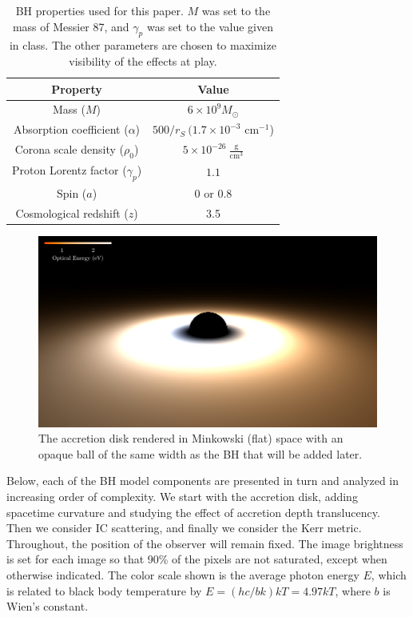 \documentclass[twocolumn,twocolappendix]{aastex631}
\begin{document}
\begin{table}[htbp!]
  \centering
  \begin{tabular}{cc}
    \hline \hline 
    Property  & Value \\ \hline
    Mass ($M$) & $6 \times 10^{9} M_\odot$ \\ 
    Absorption coefficient ($\alpha$) & $500/r_S\ (1.7\times 10^{-3}$ cm$^{-1}$) \\ 
    Corona scale density ($\rho_0$) & $5 \times 10^{-26}\ \frac{\text{g}}{\text{cm}^3}$ \\ 
    Proton Lorentz factor ($\gamma_p$) & $1.1$ \\ 
    Spin ($a$) & 0 or 0.8 \\ 
    Cosmological redshift ($z$) & 3.5 \\ 
    \hline \hline
  \end{tabular}
  \caption{BH properties used for this paper. $M$ was set to the mass of Messier 87, and $\gamma_p$ was set to the value given in class. The other parameters are chosen to maximize visibility of the effects at play.}
  \label{tab:props}
\end{table}

\begin{figure}[htbp!]
  \centering
  \includegraphics[width=\linewidth]{../imager/small/minkowski-optical.pdf}
  \caption{The accretion disk rendered in Minkowski (flat) space with an opaque ball of the same width as the BH that will be added later.}
  \label{fig:mink}
\end{figure}

Below, each of the BH model components are presented in turn and analyzed in increasing order of complexity. We start with the accretion disk, adding spacetime curvature and studying the effect of accretion depth translucency. Then we consider IC scattering, and finally we consider the Kerr metric. Throughout, the position of the observer will remain fixed. The image brightness is set for each image so that 90\% of the pixels are not saturated, except when otherwise indicated. The color scale shown is the average photon energy $E$, which is related to black body temperature by $E = (hc/bk)kT = 4.97 kT$, where $b$ is Wien's constant.
\end{document}
